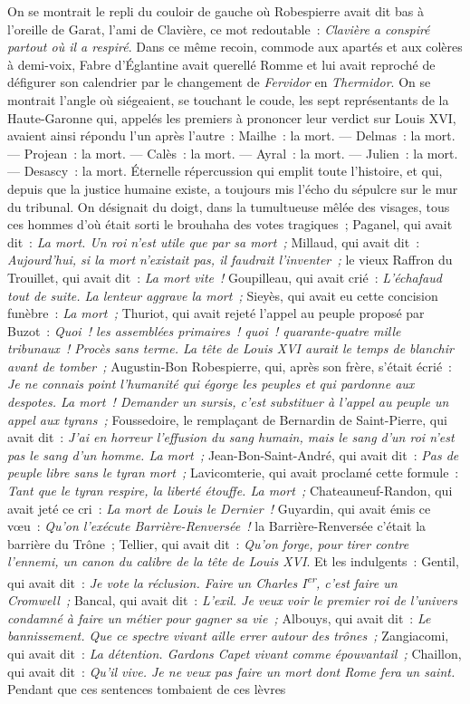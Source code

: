 \documentclass[french,twoside]{book} %
\def\mednobreak{\ifdim\lastskip<\medskipamount
  \removelastskip\nopagebreak\medskip\fi}
\newcommand{\labelblock}[1]{\medbreak{\noindent\color{rubric}\bfseries #1}\par\mednobreak}
\begin{document}
\labelblock{vii}

\noindent On se montrait le repli du couloir de gauche où Robespierre avait dit bas à l’oreille de Garat, l’ami de Clavière, ce mot redoutable : \emph{Clavière a conspiré partout où il a respiré}. Dans ce même recoin, commode aux apartés et aux colères à demi-voix, Fabre d’Églantine avait querellé Romme et lui avait reproché de défigurer son calendrier par le changement de \emph{Fervidor} en \emph{Thermidor}. On se montrait l’angle où siégeaient, se touchant le coude, les sept représentants de la Haute-Garonne qui, appelés les premiers à prononcer leur verdict sur Louis XVI, avaient ainsi répondu l’un après l’autre : Mailhe : la mort. — Delmas : la mort. — Projean : la mort. — Calès : la mort. — Ayral : la mort. — Julien : la mort. — Desascy : la mort. Éternelle répercussion qui emplit toute l’histoire, et qui, depuis que la justice humaine existe, a toujours mis l’écho du sépulcre sur le mur du tribunal. On désignait du doigt, dans la tumultueuse mêlée des visages, tous ces hommes d’où était sorti le brouhaha des votes tragiques ; Paganel, qui avait dit : \emph{La mort. Un roi n’est utile que par sa mort ;} Millaud, qui avait dit : \emph{Aujourd’hui, si la mort n’existait pas, il faudrait l’inventer ;} le vieux Raffron du Trouillet, qui avait dit : \emph{La mort vite !} Goupilleau, qui avait crié : \emph{L’échafaud tout de suite. La lenteur aggrave la mort ;}  Sieyès, qui avait eu cette concision funèbre : \emph{La mort ; } Thuriot, qui avait rejeté l’appel au peuple proposé par Buzot : \emph{Quoi ! les assemblées primaires ! quoi ! quarante-quatre mille tribunaux ! Procès sans terme. La tête de Louis XVI aurait le temps de blanchir avant de tomber ;} Augustin-Bon Robespierre, qui, après son frère, s’était écrié : \emph{Je ne connais point l’humanité qui égorge les peuples et qui pardonne aux despotes. La mort ! Demander un sursis, c’est substituer à l’appel au peuple un appel aux tyrans ;} Foussedoire, le remplaçant de Bernardin de Saint-Pierre, qui avait dit : \emph{J’ai en horreur l’effusion du sang humain, mais le sang d’un roi n’est pas le sang d’un homme. La mort ;} Jean-Bon-Saint-André, qui avait dit : \emph{Pas de peuple libre sans le tyran mort ;} Lavicomterie, qui avait proclamé cette formule : \emph{Tant que le tyran respire, la liberté étouffe. La mort ;} Chateauneuf-Randon, qui avait jeté ce cri : \emph{La mort de Louis le Dernier !} Guyardin, qui avait émis ce vœu : \emph{Qu’on l’exécute Barrière-Renversée !} la Barrière-Renversée c’était la barrière du Trône ; Tellier, qui avait dit : \emph{Qu’on forge, pour tirer contre l’ennemi, un canon du calibre de la tête de Louis XVI}. Et les indulgents : Gentil, qui avait dit : \emph{Je vote la réclusion. Faire un Charles I\textsuperscript{er}, c’est faire un Cromwell ;} Bancal, qui avait dit : \emph{L’exil. Je veux voir le premier roi de l’univers condamné à faire un métier pour gagner sa vie ;} Albouys, qui avait dit : \emph{Le bannissement. Que ce spectre vivant aille errer autour des trônes ;} Zangiacomi, qui avait dit : \emph{La détention. Gardons Capet vivant comme épouvantail ;} Chaillon, qui avait dit : \emph{Qu’il vive. Je ne veux pas faire  un mort dont Rome fera un saint.} Pendant que ces sentences tombaient de ces lèvres 
\end{document}
